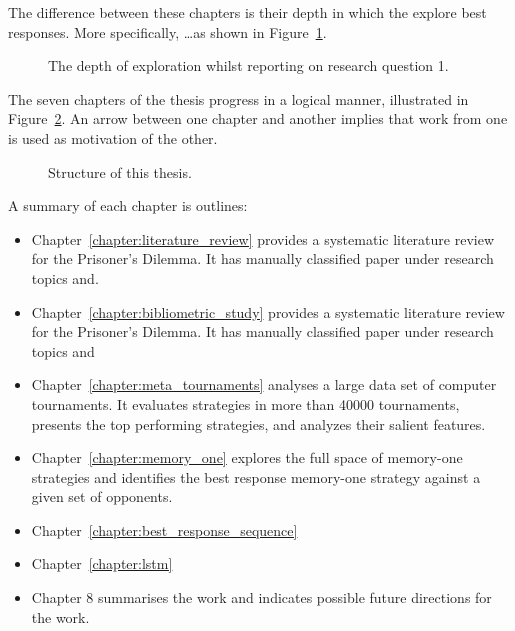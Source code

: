 The difference between these chapters is their depth in which the explore best
responses. More specifically, \dots as shown in Figure~\ref{fig:depth_structure}.

\begin{figure}[!hbtp]
    \centering
    
    \caption{The depth of exploration whilst reporting on research question 1.}\label{fig:depth_structure}
\end{figure}

The seven chapters of the thesis progress in a logical manner, illustrated in
Figure~\ref{fig:structure_of_thesis}. An arrow between one chapter and another
implies that work from one is used as motivation of the other.

\begin{figure}[!hbtp]
    \centering
    
    \caption{Structure of this thesis.}\label{fig:structure_of_thesis}
\end{figure}

A summary of each chapter is outlines:

\begin{itemize}
    \item Chapter~\ref{chapter:literature_review} provides a systematic
    literature review for the Prisoner's Dilemma. It has manually classified
    paper under research topics and.
    \item Chapter~\ref{chapter:bibliometric_study} provides a systematic
    literature review for the Prisoner's Dilemma. It has manually classified
    paper under research topics and 
    \item Chapter~\ref{chapter:meta_tournaments} analyses a large data set of
    computer tournaments. It evaluates \numberofstrategies strategies in more
    than 40000 tournaments, presents the top performing strategies, and analyzes
    their salient features.
    \item Chapter~\ref{chapter:memory_one} explores the full space of memory-one
    strategies and identifies the best response memory-one strategy against a
    given set of opponents.
    \item Chapter~\ref{chapter:best_response_sequence}
    \item Chapter~\ref{chapter:lstm}
    \item Chapter 8 summarises the work and indicates possible future directions
    for the work.
\end{itemize}

